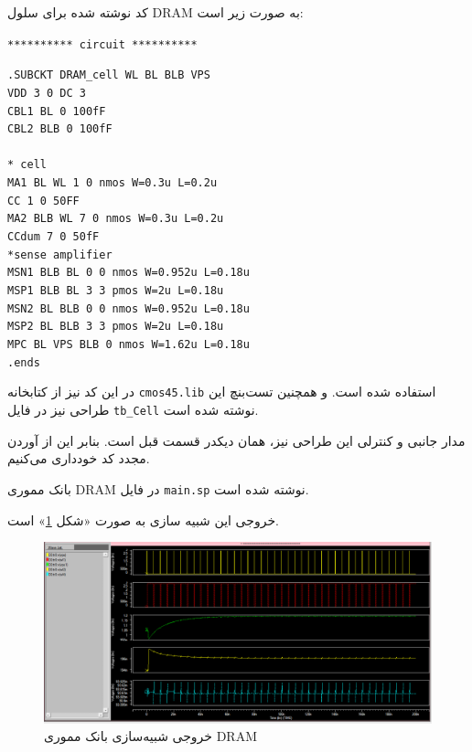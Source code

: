 \documentclass[12pt]{exam}
\begin{document}
\begin{questions}
	
	کد نوشته شده برای سلول DRAM به صورت زیر است:
	
	
	\begin{latin}
		\texttt{********** circuit **********}
		
		\texttt{.SUBCKT DRAM\_cell WL BL BLB VPS}\\
		\texttt{VDD 3 0 DC 3}\\
		\texttt{CBL1 BL 0 100fF}\\
		\texttt{CBL2 BLB 0 100fF}\\\\
		\texttt{* cell}\\
		\texttt{MA1 BL WL 1 0 nmos W=0.3u L=0.2u}\\
		\texttt{CC 1 0 50FF}\\
		\texttt{MA2 BLB WL 7 0 nmos W=0.3u L=0.2u}\\
		\texttt{CCdum 7 0 50fF}\\
		
		\texttt{*sense amplifier}\\
		\texttt{MSN1 BLB BL 0 0 nmos W=0.952u L=0.18u}\\
		\texttt{MSP1 BLB BL 3 3 pmos W=2u L=0.18u}\\
		\texttt{MSN2 BL BLB 0 0 nmos W=0.952u L=0.18u}\\
		\texttt{MSP2 BL BLB 3 3 pmos W=2u L=0.18u}\\
		\texttt{MPC BL VPS BLB 0 nmos W=1.62u L=0.18u}\\
		
		\texttt{.ends}\\
	\end{latin}
	
	 در این کد نیز از کتابخانه \texttt{cmos45.lib} استفاده شده است. و همچنین تست‌بنچ این طراحی نیز در فایل \texttt{tb\_Cell} نوشته شده است.
	 
	 مدار جانبی و کنترلی این طراحی نیز، همان دیکدر قسمت قبل است. بنابر این از آوردن مجدد کد خودداری می‌کنیم.
	 
	 بانک مموری DRAM در فایل \texttt{main.sp} نوشته شده است.
	 
	 خروجی این شبیه سازی به صورت «شکل \textcolor{blue}{\ref{خروجی شبیه‌سازی بانک مموری DRAM}}» است.
	 
	 \begin{figure}[h]
	 	\centering
	 	\includegraphics[width=1\textwidth]{images/img4}
	 	\caption{خروجی شبیه‌سازی بانک مموری DRAM}
	 	\label{خروجی شبیه‌سازی بانک مموری DRAM}
	 \end{figure}
	 

\end{questions}
\end{document}
